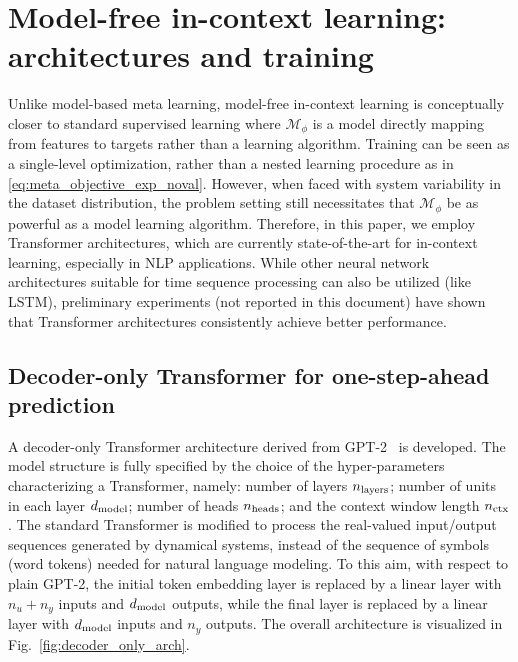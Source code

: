 \documentclass{article}
\newcommand{\free}{\mathcal{M}}
\begin{document}
\section{Model-free in-context learning: architectures and training}
\label{sec:train}

Unlike model-based meta learning, model-free in-context learning is conceptually closer  
to standard supervised learning where $\free_\phi$ is  a model directly mapping from features to targets rather than a learning algorithm. %
Training can be seen as a single-level optimization, rather than a nested learning procedure as in 	\eqref{eq:meta_objective_exp_noval}.
However, when faced with system variability in the dataset distribution, the problem setting still necessitates that $\free_\phi$ be as powerful as a model learning algorithm. Therefore, in this paper, we employ Transformer architectures, which are currently state-of-the-art for in-context learning, especially in NLP applications. While other neural network architectures suitable for time sequence processing can also be utilized (like LSTM), preliminary   experiments (not reported in this document) have shown that  Transformer architectures consistently achieve better performance.




\subsection{Decoder-only Transformer for one-step-ahead prediction} \label{sec:train_onestep}

 A  decoder-only Transformer architecture derived from GPT-2~\cite{radford2019language} is developed.
 The model structure is fully specified by the choice of the hyper-parameters characterizing a Transformer, namely:  number of layers $n_{\rm layers}$; number of units in each layer $d_{\rm model}$; number of heads $n_{\rm heads}$; and the context window length $n_{\rm ctx}$. 
The standard Transformer   is modified to process the real-valued input/output sequences generated by dynamical systems, instead of the sequence of symbols (word tokens) needed for natural language modeling. To this aim, with respect to plain GPT-2, the initial token embedding layer is replaced by a linear layer with $n_u+n_y$ inputs and $d_{\rm model}$ outputs, while the final layer is replaced by a linear layer with $d_{\rm model}$ inputs and $n_y$ outputs. 
The overall architecture is visualized in Fig.~\ref{fig:decoder_only_arch}. 
\end{document}

